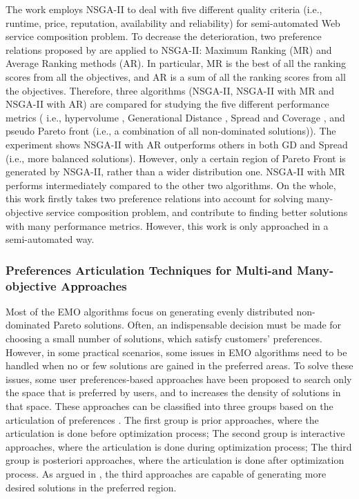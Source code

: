 The work \cite{de2010many} employs NSGA-II to deal with five different quality criteria (i.e., runtime, price, reputation, availability and reliability) for semi-automated Web service composition problem.  To decrease the deterioration, two preference relations proposed by \cite{bentley1997finding} are applied to NSGA-II: Maximum Ranking (MR) and Average Ranking methods (AR). In particular, MR is the best of all the ranking scores from all the objectives, and AR is a sum of all the ranking scores from all the objectives. Therefore, three algorithms (NSGA-II, NSGA-II with MR and NSGA-II with AR) are compared for studying the five different performance metrics ( i.e., hypervolume \cite{zitzler1999evolutionary}, Generational Distance \cite{van2000measuring}, Spread and Coverage \cite{zitzler2000comparison}, and pseudo Pareto front (i.e., a combination of all non-dominated solutions)). The experiment shows NSGA-II with AR outperforms others in both GD and Spread (i.e., more balanced solutions). However, only a certain region of Pareto Front is generated by NSGA-II, rather than a wider distribution one. NSGA-II with MR performs intermediately compared to the other two algorithms. On the whole, this work firstly takes two preference relations into account for solving many-objective service composition problem, and contribute to finding better solutions with many performance metrics. However, this work is only approached in a semi-automated way.


\subsubsection{Preferences Articulation Techniques for Multi-and Many-objective Approaches}\label{PreferencesMultiObjective}
Most of the EMO algorithms focus on generating evenly distributed non-dominated Pareto solutions. Often, an indispensable decision must be made for choosing a small number of solutions, which satisfy customers' preferences. However, in some practical scenarios, some issues in EMO algorithms need to be handled when no or few solutions are gained in the preferred areas. To solve these issues, some user preferences-based approaches have been proposed to search only the space that is preferred by users, and to increases the density of solutions in that space. These approaches can be classified into three groups based on the articulation of preferences \cite{van2000multiobjective}. The first group is prior approaches, where the articulation is done before optimization process; The second group is interactive approaches, where the articulation is done during optimization process; The third group is posteriori approaches, where the articulation is done after optimization process. As argued in \cite{giagkiozis2014pareto}, the third approaches are capable of generating more desired solutions in the preferred region. 


